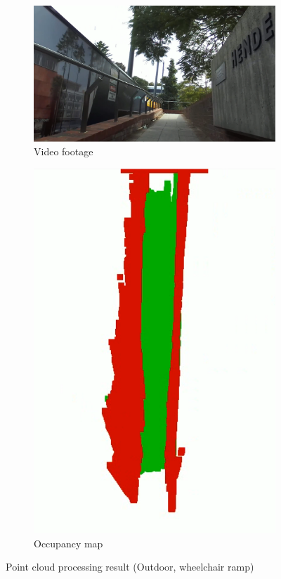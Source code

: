 \begin{figure}[b]
    \centering
    \begin{subfigure}{.64\textwidth}
        \centering
        \includegraphics[width=\linewidth]{images/pcloud_outdoor_good_video.PNG}
        \caption{Video footage}
    \end{subfigure}
    \quad
    \begin{subfigure}{.24\textwidth}
        \centering
        \includegraphics[width=\linewidth]{images/pcloud_outdoor_good.PNG}
        \caption{Occupancy map}
    \end{subfigure}
    \caption{Point cloud processing result (Outdoor, wheelchair ramp)}
    \label{fig:pcloud_outdoor_good}
\end{figure}

